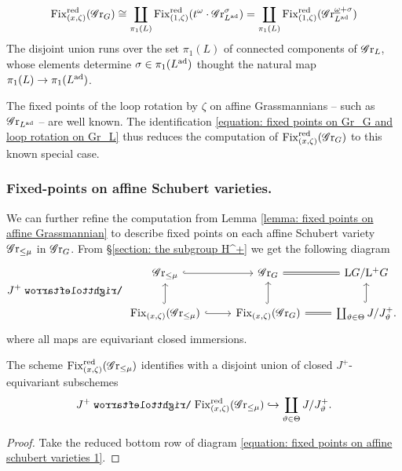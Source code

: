\begin{equation}\label{equation: fixed points on Gr_G and loop rotation on Gr_L}
    \operatorname{Fix}^{\operatorname{red}}_{(x, \zeta)}(\operatorname{\mathscr{G}r}_G) 
    \cong \coprod_{\pi_1(L)} \operatorname{Fix}^{\operatorname{red}}_{(1, \zeta)}(t^{\omega} \cdot \operatorname{\mathscr{G}r}^{{\sigma}}_{L^{\operatorname{ad}}})
    = \coprod_{\pi_1(L)} \operatorname{Fix}^{\operatorname{red}}_{(1, \zeta)}(\operatorname{\mathscr{G}r}^{{\underline{\omega} + \sigma}}_{L^{\operatorname{ad}}})
\end{equation}
The disjoint union runs over the set $\pi_1(L)$ of connected components of $\operatorname{\mathscr{G}r}_L$, whose elements determine $\sigma \in \pi_1(L^{\operatorname{ad}})$ thought the natural map $\pi_1(L) \to \pi_1(L^{\operatorname{ad}})$.


The fixed points of the loop rotation by $\zeta$ on affine Grassmannians -- such as $\operatorname{\mathscr{G}r}_{L^{\operatorname{ad}}}$ -- are well known. The identification \eqref{equation: fixed points on Gr_G and loop rotation on Gr_L} thus reduces the computation of $\operatorname{Fix}^{\operatorname{red}}_{(x, \zeta)}(\operatorname{\mathscr{G}r}_G)$ to this known special case.






\subsubsection{Fixed-points on affine Schubert varieties.}
We can further refine the computation from Lemma \ref{lemma: fixed points on affine Grassmannian} to describe fixed points on each affine Schubert variety $\operatorname{\mathscr{G}r}_{\leq \mu}$ in $\operatorname{\mathscr{G}r}_G$.
From \S \ref{section: the subgroup H^+} we get the following diagram
\begin{equation}\label{equation: fixed points on affine schubert varieties 1}
J^+ \acts
\begin{tikzcd}
    \Gr_{\leq \mu}  \arrow[r, hookrightarrow] & \Gr_G \arrow[r, equal] & \lo G / \lop G \\
    \Fix_{(x, \zeta)}(\Gr_{\leq \mu}) \arrow[u, hookrightarrow] \arrow[r, hookrightarrow] & \Fix_{(x, \zeta)}(\Gr_G) \arrow[u, hookrightarrow]  \arrow[r, equal] & \coprod_{\vartheta \in \Theta} J/J^{+}_{\vartheta}. \arrow[u, hookrightarrow]
\end{tikzcd}
\end{equation}
where all maps are equivariant closed immersions.

\begin{lemma}\label{lemma: upshot of the general case}
The scheme $\operatorname{Fix}^{\operatorname{red}}_{(x, \zeta)}(\operatorname{\mathscr{G}r}_{\leq \mu})$ identifies with a disjoint union of closed $J^+$-equivariant subschemes
\begin{equation*}\label{equation: B-equivariant closed immersion into classical flag varieties general case}
J^+ \acts \Fix^{\red}_{(x, \zeta)}(\Gr_{\leq \mu}) \hookrightarrow \coprod_{\vartheta \in \Theta} J/J^+_{\vartheta}.
\end{equation*}
\end{lemma}
\begin{proof}
Take the reduced bottom row of diagram \eqref{equation: fixed points on affine schubert varieties 1}. 
\end{proof}


